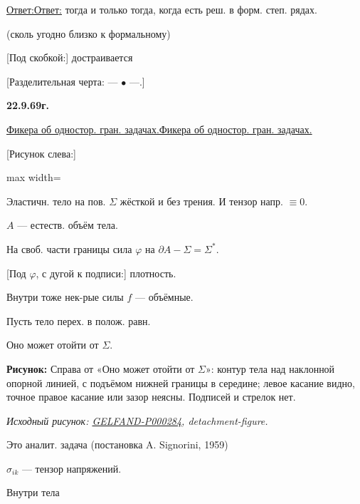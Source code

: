 \documentclass[11pt]{article}
\theoremstyle{definition}
\theoremstyle{remark}
\newcommand{\SourceFigure}[3]{%
  \par\begingroup\color{blue!60!black}\textbf{\hyperref[#1:source-page]{Source figure #1/#2}:} #3%
  \par\textit{Consult the authoritative scan at this locator.}\endgroup\par%
}
\renewcommand{\SourceFigure}[3]{%
  \par\begingroup\color{blue!55!black}\textbf{Рисунок:} #3%
  \par{\small\textit{Исходный рисунок: \hyperref[#1:source-page]{#1}, #2.}}%
  \endgroup\par%
}
\let\DiplomaticMathUnderline\underline
\renewcommand{\underline}[1]{\ifmmode\DiplomaticMathUnderline{#1}\else\uline{#1}\fi}
\begin{document}
\underline{Ответ:} тогда и только тогда, когда есть реш. в форм. степ. рядах.

(сколь угодно близко к формальному)

[Под скобкой:] достраивается

[Разделительная черта: — $\bullet$ —.]

\textbf{22.9.69г.}

\underline{Фикера об одностор. гран. задачах.}

[Рисунок слева:]
\begin{adjustbox}{max width=\linewidth}
\end{adjustbox}

Эластичн. тело на пов. $\Sigma$ жёсткой и без трения.
И тензор напр. $\equiv0$.

$A$ — естеств. объём тела.

На своб. части границы сила $\varphi$ на $\partial A-\Sigma=\Sigma^*$.

[Под $\varphi$, с дугой к подписи:] плотность.

Внутри тоже нек-рые силы $f$ — объёмные.

Пусть тело перех. в полож. равн.

Оно может отойти от $\Sigma$.

\SourceFigure{GELFAND-P000284}{detachment-figure}{Справа от «Оно может отойти от $\Sigma$»: контур тела над наклонной опорной линией, с подъёмом нижней границы в середине; левое касание видно, точное правое касание или зазор неясны. Подписей и стрелок нет.}

Это аналит. задача (постановка A. Signorini, 1959)

$\sigma_{ik}$ — тензор напряжений.

Внутри тела
\end{document}
